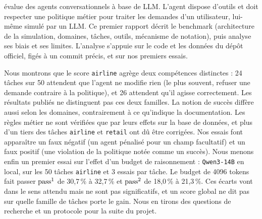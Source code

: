\taub{} évalue des agents conversationnels à base de LLM. L'agent dispose d'outils et doit respecter une politique métier pour traiter les demandes d'un utilisateur, lui-même simulé par un LLM. Ce premier rapport décrit le benchmark (architecture de la simulation, domaines, tâches, outils, mécanisme de notation), puis analyse ses biais et ses limites. L'analyse s'appuie sur le code et les données du dépôt officiel, figés à un commit précis, et sur nos premiers essais.

Nous montrons que le score \texttt{airline} agrège deux compétences distinctes : 24 tâches sur 50 attendent que l'agent ne modifie rien (le plus souvent, refuser une demande contraire à la politique), et 26 attendent qu'il agisse correctement. Les résultats publiés ne distinguent pas ces deux familles. La notion de succès diffère aussi selon les domaines, contrairement à ce qu'indique la documentation. Les règles métier ne sont vérifiées que par leurs effets sur la base de données, et plus d'un tiers des tâches \texttt{airline} et \texttt{retail} ont dû être corrigées. Nos essais font apparaître un faux négatif (un agent pénalisé pour un champ facultatif) et un faux positif (une violation de la politique notée comme un succès). Nous menons enfin un premier essai sur l'effet d'un budget de raisonnement : \texttt{Qwen3-14B} en local, sur les 50 tâches \texttt{airline} et 3 essais par tâche. Le budget de 4096 tokens fait passer $\text{pass}^{1}$ de 30,7\,\% à 32,7\,\% et $\text{pass}^{2}$ de 18,0\,\% à 21,3\,\%. Ces écarts vont dans le sens attendu mais ne sont pas significatifs, et un score global ne dit pas sur quelle famille de tâches porte le gain. Nous en tirons des questions de recherche et un protocole pour la suite du projet.

